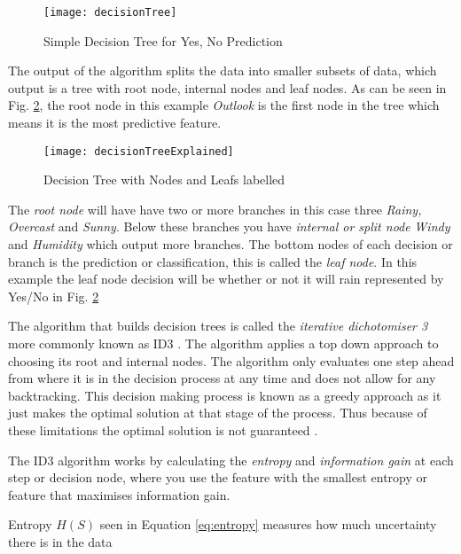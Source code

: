 \begin{figure}[H]
	\texttt{[image: decisionTree]}
	\caption{Simple Decision Tree for Yes, No Prediction \\ \cite[Source:][]{quinlan_induction_1986}}
	\label{fig:decisionTree}
\end{figure}

The output of the algorithm splits the data into smaller subsets of data, which output is a tree with root node, internal nodes and leaf nodes. As can be seen in Fig. \ref{fig:decisionTreeExplained}, the root node in this example \textit{Outlook} is the first node in the tree which means it is the most predictive feature. 

\begin{figure}[H]
	\texttt{[image: decisionTreeExplained]}
	\caption{Decision Tree with Nodes and Leafs labelled}
	\label{fig:decisionTreeExplained}
\end{figure}

The \textit{root node} will have have two or more branches in this case three \textit{Rainy, Overcast} and \textit{Sunny}. Below these branches you have \textit{internal or split node} \textit{Windy} and \textit{Humidity} which output more branches. The bottom nodes of each decision or branch is the prediction or classification, this is called the \textit{leaf node}. In this example the leaf node decision will be whether or not it will rain represented by Yes/No in Fig. \ref{fig:decisionTreeExplained}

The algorithm that builds decision trees is called the \textit{iterative dichotomiser 3} more commonly known as ID3 \citep{quinlan_induction_1986}. The algorithm applies a top down approach to choosing its root and internal nodes. The algorithm only evaluates one step ahead from where it is in the decision process at any time and does not allow for any backtracking. This decision making process is known as a greedy approach as it just makes the optimal solution at that stage of the process. Thus because of these limitations the optimal solution is not guaranteed \citep{friedman_lazy_1996}.

The ID3 algorithm works by calculating the \textit{entropy} and \textit{information gain} at each step or decision node, where you use the feature with the smallest entropy or feature that maximises information gain.

Entropy $H(S)$ seen in Equation \ref{eq:entropy} measures how much uncertainty there is in the data \citep{shannon_mathematical_2001}

